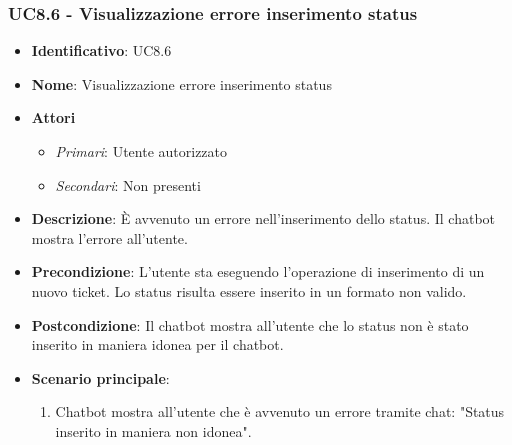 \subsubsection{UC8.6 - Visualizzazione errore inserimento status}
\begin{itemize}
	\item \textbf{Identificativo}: UC8.6
	\item \textbf{Nome}: Visualizzazione errore inserimento status 
	\item \textbf{Attori}
	\begin{itemize} 
		\item \textit{Primari}: Utente autorizzato
		\item \textit{Secondari}: Non presenti
	\end{itemize}
	\item \textbf{Descrizione}: È avvenuto un errore nell'inserimento dello status. Il chatbot mostra l'errore all'utente.
	\item \textbf{Precondizione}: L'utente sta eseguendo l'operazione di inserimento di un nuovo ticket. Lo status risulta essere inserito in un formato non valido. 
	\item \textbf{Postcondizione}: Il chatbot mostra all'utente che lo status non è stato inserito in maniera idonea per il chatbot.
	\item \textbf{Scenario principale}: 
	\begin{enumerate}
		\item Chatbot mostra all'utente che è avvenuto un errore tramite chat: "Status inserito in maniera non idonea". 
	\end{enumerate}
\end{itemize}

